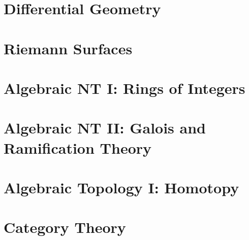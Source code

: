 \documentclass[11pt,twoside=semi,openright,numbers=noenddot,titlepage=false]{scrbook}
\begin{document}
\part{Differential Geometry}
\label{part:diffgeo}
\parttoc



\part{Riemann Surfaces}
\label{part:riemann}
\parttoc







\part{Algebraic NT I: Rings of Integers}
\label{part:algnt1}
\parttoc







\part{Algebraic NT II: Galois and Ramification Theory}
\label{part:algnt2}
\parttoc





\part{Algebraic Topology I: Homotopy}
\label{part:algtop1}
\parttoc



\part{Category Theory}
\label{part:cats}
\parttoc


\end{document}
